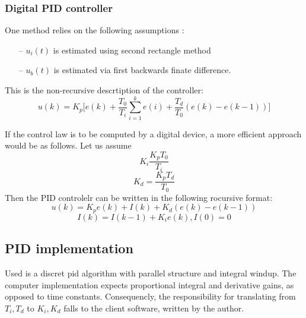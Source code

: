 \subsubsection{Digital PID controller}
One method \cite{garipov} relies on the following assumptions \cite[p. 88]{garipov}:
\begin{itemize}
\item[--]{$u_i(t)$ is estimated using second rectangle method}
\item[--]{$u_b(t)$ is estimated via first backwards finate difference.}
\end{itemize}
This is the non-recursive descrtiption of the controller:
\begin{equation}
    u(k) = K_p \Bigg[
    e(k) + \frac{T_0}{T_i} \sum_{i=1}^{k} e(i) + \frac{T_d}{T_0} (e(k)-e(k-1))
    \Bigg]
\end{equation}
\par
If the control law is to be computed by a digital device, a more efficient approach would be as follows.
Let us assume
$$ K_i \frac{K_p T_0}{T_i} $$
$$ K_d = \frac{K_p T_d}{T_0} $$
Then the PID controlelr can be written in the following rocursive format:
\begin{equation}
    u(k) = K_p e(k) + I(k) + K_d (e(k) - e(k-1))
\end{equation}
\begin{equation}
    I(k) = I(k-1) + K_i e(k),
    I(0) = 0
\end{equation}

\subsection{PID implementation}
Used is a discret pid algorithm with parallel structure and integral windup.
The computer implementation expects proportional integral and derivative gains, as opposed to time constants.
Consequencly, the responsibility for translating from $T_i, T_d$ to $K_i, K_d$ falls to the client software, written by the author.

